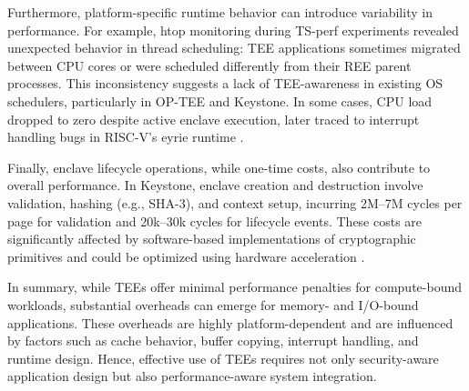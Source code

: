 Furthermore, platform-specific runtime behavior can introduce variability in performance. For example, htop monitoring during TS-perf experiments revealed unexpected behavior in thread scheduling: TEE applications sometimes migrated between CPU cores or were scheduled differently from their REE parent processes. This inconsistency suggests a lack of TEE-awareness in existing OS schedulers, particularly in OP-TEE and Keystone. In some cases, CPU load dropped to zero despite active enclave execution, later traced to interrupt handling bugs in RISC-V’s eyrie runtime \cite{Suzaki2021}.

Finally, enclave lifecycle operations, while one-time costs, also contribute to overall performance. In Keystone, enclave creation and destruction involve validation, hashing (e.g., SHA-3), and context setup, incurring 2M–7M cycles per page for validation and 20k–30k cycles for lifecycle events. These costs are significantly affected by software-based implementations of cryptographic primitives and could be optimized using hardware acceleration \cite{dayeol2019keystone}.

In summary, while TEEs offer minimal performance penalties for compute-bound workloads, substantial overheads can emerge for memory- and I/O-bound applications. These overheads are highly platform-dependent and are influenced by factors such as cache behavior, buffer copying, interrupt handling, and runtime design. Hence, effective use of TEEs requires not only security-aware application design but also performance-aware system integration.
